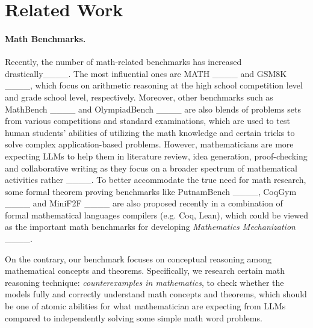 \section{Related Work}
\paragraph{Math Benchmarks.} Recently, the number of math-related benchmarks has increased drastically____. The most influential ones are MATH ____ and GSM8K ____, which focus on arithmetic reasoning at the high school competition level and grade school level, respectively. Moreover, other benchmarks such as MathBench ____ and OlympiadBench ____ are also blends of problems sets from various competitions and standard examinations, which are used to test human students' abilities of utilizing the math knowledge and certain tricks to solve complex application-based problems. However, mathematicians are more expecting LLMs to help them in literature review, idea generation, proof-checking and collaborative writing as they focus on a broader spectrum of mathematical activities rather ____. To better accommodate the true need for math research, some formal theorem proving benchmarks like PutnamBench ____, CoqGym ____ and MiniF2F ____ are also proposed recently in a combination of formal mathematical languages compilers (e.g. Coq, Lean), which could be viewed as the important math benchmarks for developing \textit{Mathematics Mechanization} ____.

On the contrary, our benchmark \dataname{} focuses on conceptual reasoning among mathematical concepts and theorems. Specifically, we research certain math reasoning technique: \textit{counterexamples in mathematics}, to check whether the models fully and correctly understand math concepts and theorems, which should be one of atomic abilities for what mathematician are expecting from LLMs compared to independently solving some simple math word problems.


